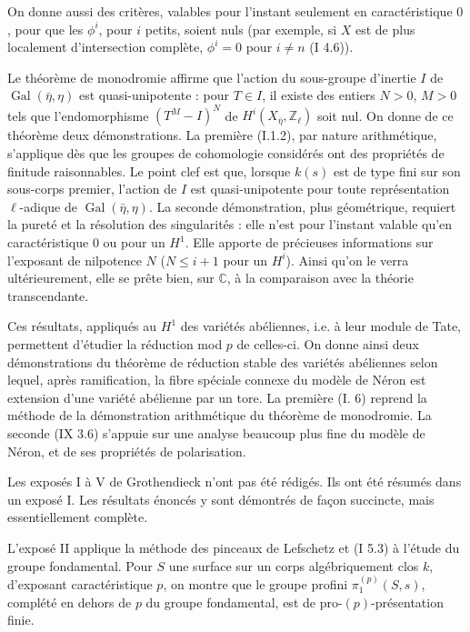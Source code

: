 On donne aussi des critères, valables pour l'instant seulement en caractéristique
$0$, pour que les $\phi^i$, pour $i$ petits, soient nuls (par exemple, si $X$ est de plus
localement d'intersection complète, $\phi^i=0$ pour $i\ne n$ (I 4.6)).
\clearpage

Le théorème de monodromie affirme que l'action du sous-groupe d'inertie $I$
de $\operatorname{Gal}(\bar\eta,\eta)$ est quasi-unipotente : pour $T\in I$, il existe des entiers $N>0$,
$M>0$ tels que l'endomorphisme $(T^M-I)^N$ de $H^i(X_{\bar\eta},\mathbb Z_\ell)$ soit nul. On donne de ce
théorème deux démonstrations. La première (I.1.2), par nature arithmétique, s'applique
dès que les groupes de cohomologie considérés ont des propriétés de finitude raisonnables.
Le point clef est que, lorsque $k(s)$ est de type fini sur son sous-corps
premier, l'action de $I$ est quasi-unipotente pour toute représentation $\ell$-adique de
$\operatorname{Gal}(\bar\eta,\eta)$. La seconde démonstration, plus géométrique, requiert la pureté et la résolution
des singularités : elle n'est pour l'instant valable qu'en caractéristique $0$
ou pour un $H^1$. Elle apporte de précieuses informations sur l'exposant de nilpotence
$N$ ($N\leq i+1$ pour un $H^i$). Ainsi qu'on le verra ultérieurement, elle se prête bien,
sur $\mathbb C$, à la comparaison avec la théorie transcendante.

Ces résultats, appliqués au $H^1$ des variétés abéliennes, i.e. à leur module
de Tate, permettent d'étudier la réduction mod $p$ de celles-ci. On donne ainsi deux
démonstrations du théorème de réduction stable des variétés abéliennes selon lequel,
après ramification, la fibre spéciale connexe du modèle de Néron est extension d'une
variété abélienne par un tore. La première (I. 6) reprend la méthode de la démonstration
arithmétique du théorème de monodromie. La seconde (IX 3.6) s'appuie sur une
analyse beaucoup plus fine du modèle de Néron, et de ses propriétés de polarisation.

Les exposés I à V de Grothendieck n'ont pas été rédigés. Ils ont été résumés
dans un exposé I. Les résultats énoncés y sont démontrés de façon succincte, mais
essentiellement complète.

L'exposé II applique la méthode des pinceaux de Lefschetz et (I 5.3) à
l'étude du groupe fondamental. Pour $S$ une surface sur un corps algébriquement clos
$k$, d'exposant caractéristique $p$, on montre que le groupe profini $\pi_1^{(p)}(S,s)$, complété
en dehors de $p$ du groupe fondamental, est de pro-$(p)$-présentation finie.

